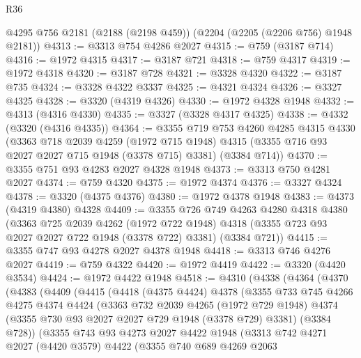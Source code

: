 \begin{lexlean}{R36}
\begin{coremodule}
    @4295
    @756
    @2181
    (@2188 (@2198 @459))
    (@2204 (@2205 (@2206 @756) @1948 @2181))
@4313 := @3313 @754 @4286 @2027
@4315 := @759 (@3187 @714)
@4316 := @1972 @4315
@4317 := @3187 @721
@4318 := @759 @4317
@4319 := @1972 @4318
@4320 := @3187 @728
@4321 := @3328 @4320
@4322 := @3187 @735
@4324 := @3328 @4322 @3337
@4325 := @4321 @4324
@4326 := @3327 @4325
@4328 := @3320 (@4319 @4326)
@4330 := @1972 @4328 @1948
@4332 := @4313 (@4316 @4330)
@4335 := @3327 (@3328 @4317 @4325)
@4338 := @4332 (@3320 (@4316 @4335))
@4364 := @3355
    @719
    @753
    @4260
    @4285
    @4315
    @4330
    (@3363
      @718
      @2039
      @4259
      (@1972 @715 @1948)
      @4315
      (@3355 @716 @93 @2027 @2027 @715 @1948 (@3378 @715) @3381)
      (@3384 @714))
@4370 := @3355 @751 @93 @4283 @2027 @4328 @1948
@4373 := @3313 @750 @4281 @2027
@4374 := @759 @4320
@4375 := @1972 @4374
@4376 := @3327 @4324
@4378 := @3320 (@4375 @4376)
@4380 := @1972 @4378 @1948
@4383 := @4373 (@4319 @4380) @4328
@4409 := @3355
    @726
    @749
    @4263
    @4280
    @4318
    @4380
    (@3363
      @725
      @2039
      @4262
      (@1972 @722 @1948)
      @4318
      (@3355 @723 @93 @2027 @2027 @722 @1948 (@3378 @722) @3381)
      (@3384 @721))
@4415 := @3355 @747 @93 @4278 @2027 @4378 @1948
@4418 := @3313 @746 @4276 @2027
@4419 := @759 @4322
@4420 := @1972 @4419
@4422 := @3320 (@4420 @3534)
@4424 := @1972 @4422 @1948
@4518 := @4310
    (@4338
      (@4364
        (@4370
          (@4383
            (@4409
              (@4415
                (@4418
                  (@4375 @4424)
                  @4378
                  (@3355
                    @733
                    @745
                    @4266
                    @4275
                    @4374
                    @4424
                    (@3363
                      @732
                      @2039
                      @4265
                      (@1972 @729 @1948)
                      @4374
                      (@3355 @730 @93 @2027 @2027 @729 @1948 (@3378 @729) @3381)
                      (@3384 @728))
                    (@3355
                      @743
                      @93
                      @4273
                      @2027
                      @4422
                      @1948
                      (@3313
                        @742
                        @4271
                        @2027
                        (@4420 @3579)
                        @4422
                        (@3355
                          @740
                          @689
                          @4269
                          @2063

\end{coremodule}
\end{lexlean}
